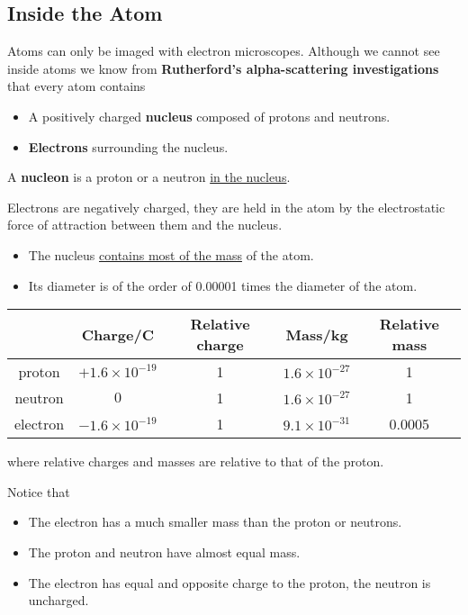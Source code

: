 \subsection{Inside the Atom}

Atoms can only be imaged with electron microscopes. Although we cannot see inside atoms we know from \textbf{Rutherford's alpha-scattering investigations} that every atom contains
\begin{itemize}
    \item A positively charged \textbf{nucleus} composed of protons and neutrons.
    \item \textbf{Electrons} surrounding the nucleus.
\end{itemize}

A \textbf{nucleon} is a proton or a neutron \underline{in the nucleus}.

Electrons are negatively charged, they are held in the atom by the electrostatic force of attraction between them and the nucleus.

\begin{itemize}
    \item The nucleus \underline{contains most of the mass} of the atom.
    \item Its diameter is of the order of 0.00001 times the diameter of the atom.
\end{itemize}

\begin{center}
\begin{tabular}{|c|c|c|c|c|}
    \hline
    & Charge/C & Relative charge & Mass/kg & Relative mass\\
    \hline
    proton & $+1.6\times10^{-19}$ & 1 & $1.6\times10^{-27}$ & 1\\
    neutron & $0$ & 1 & $1.6\times10^{-27}$ & 1\\
    electron & $-1.6\times10^{-19}$ & 1 & $9.1\times10^{-31}$ & 0.0005\\
    \hline
\end{tabular}
\end{center}
where relative charges and masses are relative to that of the proton.

Notice that
\begin{itemize}
    \item The electron has a much smaller mass than the proton or neutrons.
    \item The proton and neutron have almost equal mass.
    \item The electron has equal and opposite charge to the proton, the neutron is uncharged.
\end{itemize}

